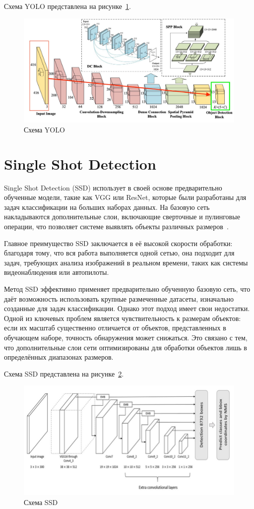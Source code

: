 Схема YOLO представлена на рисунке~\ref{yolo_sheme}.

\begin{figure}[H]
    \centering
    \includegraphics[width=0.8\linewidth]{images/yolo.png}
    \caption{Схема YOLO}
    \label{yolo_sheme}
\end{figure}

\section{Single Shot Detection}

Single Shot Detection (SSD) использует в своей основе предварительно обученные модели, такие как VGG или ResNet, которые были разработаны для задач классификации на больших наборах данных. На базовую сеть накладываются дополнительные слои, включающие сверточные и пулинговые операции, что позволяет системе выявлять объекты различных размеров~\cite{ssd}.

Главное преимущество SSD заключается в её высокой скорости обработки: благодаря тому, что вся работа выполняется одной сетью, она подходит для задач, требующих анализа изображений в реальном времени, таких как системы видеонаблюдения или автопилоты.  

Метод SSD эффективно применяет предварительно обученную базовую сеть, что даёт возможность использовать крупные размеченные датасеты, изначально созданные для задач классификации. Однако этот подход имеет свои недостатки. Одной из ключевых проблем является чувствительность к размерам объектов: если их масштаб существенно отличается от объектов, представленных в обучающем наборе, точность обнаружения может снижаться. Это связано с тем, что дополнительные слои сети оптимизированы для обработки объектов лишь в определённых диапазонах размеров.

Схема SSD представлена на рисунке~\ref{ssd_sheme}.

\begin{figure}[H]
    \centering
    \includegraphics[width=0.8\linewidth]{images/ssd.png}
    \caption{Схема SSD}
    \label{ssd_sheme}
\end{figure}

